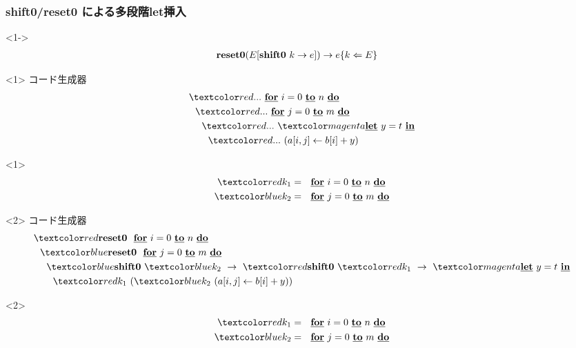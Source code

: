 \begin{frame}
  \frametitle{shift0/reset0 による多段階let挿入}
  \begin{onlyenv}<1->
    \begin{align*}
      \textbf{reset0} (E[\textbf{shift0}~ k \to e]) &\to e \{{k}\Leftarrow{E}\}
    \end{align*}
  \end{onlyenv}

  \begin{onlyenv}<1>
    コード生成器
    \begin{align*}
      & \red{...}~ \cfordo{i = 0}{n} \\
      & ~~\red{...}~ \cfordo{j = 0}{m} \\
      & ~~~~\red{...}~ \magenta{\cLet~y=t~\cIn} \\
      & ~~~~~~\red{...}~ (\aryset{a}{i,j}{b[i] + y})
    \end{align*}

    \begin{invisibleenv}<1>
      \begin{align*}
        \red{k_1} &= ~~\cfordo{i = 0}{n} \\
        \blue{k_2} &= ~~\cfordo{j = 0}{m} \\
      \end{align*}
    \end{invisibleenv}
  \end{onlyenv}

  \begin{onlyenv}<2>
    コード生成器
    \begin{align*}
      & \red{\Resetz} ~~\cfordo{i = 0}{n} \\
      & ~~\blue{\Resetz} ~~\cfordo{j = 0}{m} \\
      & ~~~~\blue{\Shiftz}~\blue{k_2}~\to~ \red{\Shiftz}~\red{k_1}~\to~ \magenta{\cLet~y=t~\cIn} \\
      & ~~~~~~\red{k_1}~(\blue{k_2}~(\aryset{a}{i,j}{b[i] + y}))
    \end{align*}
    \begin{invisibleenv}<2>
      \begin{align*}
        \red{k_1} &= ~~\cfordo{i = 0}{n} \\
        \blue{k_2} &= ~~\cfordo{j = 0}{m} \\
      \end{align*}
    \end{invisibleenv}
  \end{onlyenv}


\end{frame}
